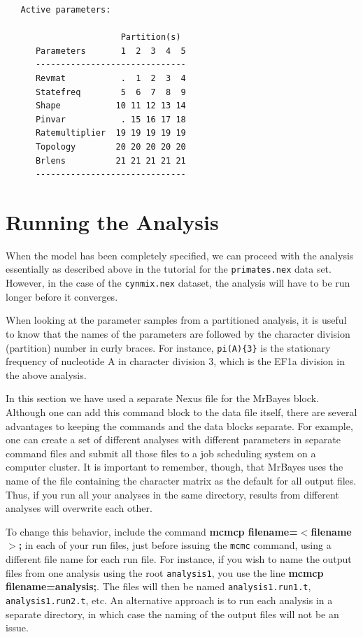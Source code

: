 \documentclass[12pt]{book}
\begin{document}
\begin{singlespacing}
\small
\begin{verbatim}
   Active parameters:
 
                       Partition(s)
      Parameters       1  2  3  4  5
      ------------------------------
      Revmat           .  1  2  3  4
      Statefreq        5  6  7  8  9
      Shape           10 11 12 13 14
      Pinvar           . 15 16 17 18
      Ratemultiplier  19 19 19 19 19
      Topology        20 20 20 20 20
      Brlens          21 21 21 21 21
      ------------------------------
\end{verbatim}
\normalsize
\end{singlespacing}

\section{Running the Analysis}

When the model has been completely specified, we can proceed with the analysis essentially as described 
above in the tutorial for the \texttt{primates.nex} data set. However, in the case of the 
\texttt{cynmix.nex} dataset, the analysis will have to be run longer before it converges.

When looking at the parameter samples from a partitioned analysis, it is useful to know that the names of 
the parameters are followed by the character division (partition) number in curly braces. For instance, 
\texttt{pi(A)\{3\}} is the stationary frequency of nucleotide A in character division 3, which is the EF1a 
division in the above analysis.

In this section we have used a separate Nexus file for the MrBayes block. Although one can add this command 
block to the data file itself, there are several advantages to keeping the commands and the data blocks 
separate. For example, one can create a set of different analyses with different parameters in separate 
command files and submit all those files to a job scheduling system on a computer cluster. It is important 
to remember, though, that MrBayes uses the name of the file containing the character matrix as the default 
for all output files. Thus, if you run all your analyses in the same directory, results from different 
analyses will overwrite each other.

To change this behavior, include the command \textbf{mcmcp filename=$<$filename$>$;} in each of your run 
files, just before issuing the \texttt{mcmc} command, using a different file name for each run file. For 
instance, if you wish to name the output files from one analysis using the root \texttt{analysis1}, you use 
the line \textbf{mcmcp filename=analysis;}. The files will then be named \texttt{analysis1.run1.t}, 
\texttt{analysis1.run2.t}, etc. An alternative approach is to run each analysis in a separate directory, in 
which case the naming of the output files will not be an issue.
\end{document}
